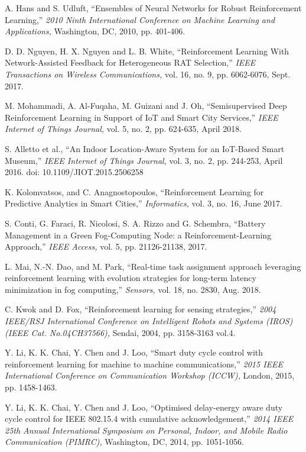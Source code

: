 \documentclass[journal]{IEEEtran}
\begin{document}
\begin{thebibliography}{1}
A. Hans and S. Udluft, ``Ensembles of Neural Networks for Robust Reinforcement Learning,'' \emph{2010 Ninth International Conference on Machine Learning and Applications,} Washington, DC, 2010, pp. 401-406.

D. D. Nguyen, H. X. Nguyen and L. B. White, ``Reinforcement Learning With Network-Assisted Feedback for Heterogeneous RAT Selection,'' \emph{IEEE Transactions on Wireless Communications,} vol. 16, no. 9, pp. 6062-6076, Sept. 2017.

M. Mohammadi, A. Al-Fuqaha, M. Guizani and J. Oh, ``Semisupervised Deep Reinforcement Learning in Support of IoT and Smart City Services,'' \emph{IEEE Internet of Things Journal,} vol. 5, no. 2, pp. 624-635, April 2018.

S. Alletto et al., ``An Indoor Location-Aware System for an IoT-Based Smart Museum,'' \emph{IEEE Internet of Things Journal,} vol. 3, no. 2, pp. 244-253, April 2016.
doi: 10.1109/JIOT.2015.2506258

K. Kolomvatsos, and C. Anagnostopoulos, ``Reinforcement Learning for Predictive Analytics in
Smart Cities,'' \emph{Informatics,} vol. 3, no. 16, June 2017.

S. Conti, G. Faraci, R. Nicolosi, S. A. Rizzo and G. Schembra, ``Battery Management in a Green Fog-Computing Node: a Reinforcement-Learning Approach,'' \emph{IEEE Access,} vol. 5, pp. 21126-21138, 2017.

L. Mai, N.-N. Dao, and M. Park, ``Real-time task assignment approach leveraging reinforcement learning with evolution strategies for long-term latency minimization in fog computing,'' \emph{Sensors,} vol. 18, no. 2830, Aug. 2018.

C. Kwok and D. Fox, ``Reinforcement learning for sensing strategies,'' \emph{2004 IEEE/RSJ International Conference on Intelligent Robots and Systems (IROS) (IEEE Cat. No.04CH37566),} Sendai, 2004, pp. 3158-3163 vol.4.

Y. Li, K. K. Chai, Y. Chen and J. Loo, ``Smart duty cycle control with reinforcement learning for machine to machine communications,'' \emph{2015 IEEE International Conference on Communication Workshop (ICCW),} London, 2015, pp. 1458-1463.

Y. Li, K. K. Chai, Y. Chen and J. Loo, ``Optimised delay-energy aware duty cycle control for IEEE 802.15.4 with cumulative acknowledgement,'' \emph{2014 IEEE 25th Annual International Symposium on Personal, Indoor, and Mobile Radio Communication (PIMRC),} Washington, DC, 2014, pp. 1051-1056.


\end{thebibliography}
\end{document}

